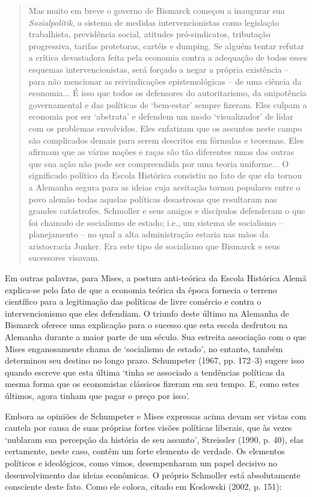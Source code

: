 \documentclass[12pt]{article}
\begin{document}
\begin{quote}
Mas muito em breve o governo de Bismarck começou a inaugurar sua \textit{Sozialpolitik}, o sistema de medidas intervencionistas como legislação trabalhista, previdência social, atitudes pró-sindicatos, tributação progressiva, tarifas protetoras, cartéis e dumping. Se alguém tentar refutar a crítica devastadora feita pela economia contra a adequação de todos esses esquemas intervencionistas, será forçado a negar a própria existência – para não mencionar as reivindicações epistemológicas – de uma ciência da economia... É isso que todos os defensores do autoritarismo, da onipotência governamental e das políticas de ‘bem-estar’ sempre fizeram. Eles culpam a economia por ser ‘abstrata’ e defendem um modo ‘visualizador’ de lidar com os problemas envolvidos. Eles enfatizam que os assuntos neste campo são complicados demais para serem descritos em fórmulas e teoremas. Eles afirmam que as várias nações e raças são tão diferentes umas das outras que sua ação não pode ser compreendida por uma teoria uniforme... O significado político da Escola Histórica consistiu no fato de que ela tornou a Alemanha segura para as ideias cuja aceitação tornou populares entre o povo alemão todas aquelas políticas desastrosas que resultaram nas grandes catástrofes. Schmoller e seus amigos e discípulos defenderam o que foi chamado de socialismo de estado; i.e., um sistema de socialismo – planejamento – no qual a alta administração estaria nas mãos da aristocracia Junker. Era este tipo de socialismo que Bismarck e seus sucessores visavam.
\end{quote}

Em outras palavras, para Mises, a postura anti-teórica da Escola Histórica Alemã explica-se pelo fato de que a economia teórica da época fornecia o terreno científico para a legitimação das políticas de livre comércio e contra o intervencionismo que eles defendiam. O triunfo deste último na Alemanha de Bismarck oferece uma explicação para o sucesso que esta escola desfrutou na Alemanha durante a maior parte de um século. Sua estreita associação com o que Mises enganosamente chama de ‘socialismo de estado’, no entanto, também determinou seu destino no longo prazo. Schumpeter (1967, pp. 172–3) sugere isso quando escreve que esta última ‘tinha se associado a tendências políticas da mesma forma que os economistas clássicos fizeram em seu tempo. E, como estes últimos, agora tinham que pagar o preço por isso’.

Embora as opiniões de Schumpeter e Mises expressas acima devam ser vistas com cautela por causa de suas próprias fortes visões políticas liberais, que às vezes ‘nublaram sua percepção da história de seu assunto’, Streissler (1990, p. 40), elas certamente, neste caso, contêm um forte elemento de verdade. Os elementos políticos e ideológicos, como vimos, desempenharam um papel decisivo no desenvolvimento das ideias econômicas. O próprio Schmoller está absolutamente consciente deste fato. Como ele coloca, citado em Koslowski (2002, p. 151):
\end{document}
